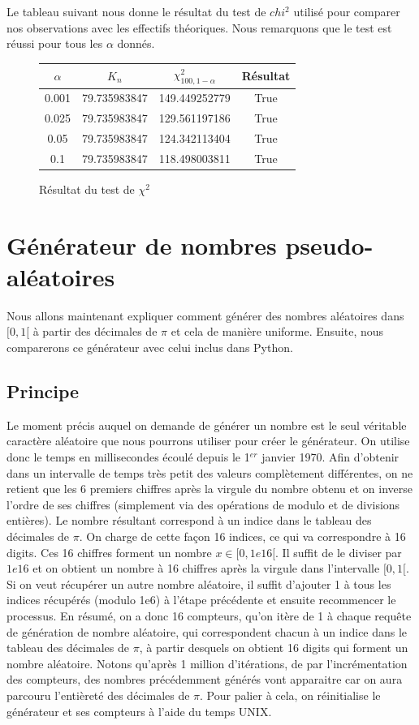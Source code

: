 \documentclass[10pt,a4paper]{article}
\begin{document}
Le tableau suivant nous donne le résultat du test de $chi^2$ utilisé pour comparer nos observations avec les effectifs théoriques. Nous remarquons que le test est réussi pour tous les $\alpha$ donnés.
\begin{figure}[H]
\begin{center}
\begin{tabular}{|c|c|c|c|}
\hline
$\alpha$ & $K_{n}$ & $\chi^2_{100, 1 - \alpha}$ & Résultat\\
\hline
0.001 & 79.735983847 & 149.449252779 & True\\
0.025 & 79.735983847 & 129.561197186 & True\\
0.05 & 79.735983847 & 124.342113404 & True\\
0.1 & 79.735983847 & 118.498003811 & True\\
\hline
\end{tabular}
\end{center}
\caption{Résultat du test de $\chi^2$}
\end{figure} 

\newpage

\section{Générateur de nombres pseudo-aléatoires}
Nous allons maintenant expliquer comment générer des nombres aléatoires dans $[0, 1[$ à partir des décimales de $\pi$ et cela de manière uniforme. Ensuite, nous comparerons ce générateur avec celui inclus dans Python.
\subsection{Principe}
Le moment précis auquel on demande de générer un nombre est le seul véritable caractère aléatoire que nous pourrons utiliser pour créer le générateur. On utilise donc le temps en millisecondes écoulé depuis le 1$^{er}$ janvier 1970. Afin d'obtenir dans un intervalle de temps très petit des valeurs complètement différentes, on ne retient que les 6 premiers chiffres après la virgule du nombre obtenu et on inverse l'ordre de ses chiffres (simplement via des opérations de modulo et de divisions entières). Le nombre résultant correspond à un indice dans le tableau des décimales de $\pi$. On charge de cette façon 16 indices, ce qui va correspondre à 16 digits. Ces 16 chiffres forment un nombre $x \in [0, 1e16[$. Il suffit de le diviser par $1e16$ et on obtient un nombre à 16 chiffres après la virgule dans l'intervalle $[0, 1[$. Si on veut récupérer un autre nombre aléatoire, il suffit d'ajouter 1 à tous les indices récupérés (modulo 1e6) à l'étape précédente et ensuite recommencer le processus. En résumé, on a donc 16 compteurs, qu'on itère de 1 à chaque requête de génération de nombre aléatoire, qui correspondent chacun à un indice dans le tableau des décimales de $\pi$, à partir desquels on obtient 16 digits qui forment un nombre aléatoire. Notons qu'après 1 million d'itérations, de par l'incrémentation des compteurs, des nombres précédemment générés vont apparaitre car on aura parcouru l'entièreté des décimales de $\pi$. Pour palier à cela, on réinitialise le générateur et ses compteurs à l'aide du temps UNIX.\\
\end{document}
